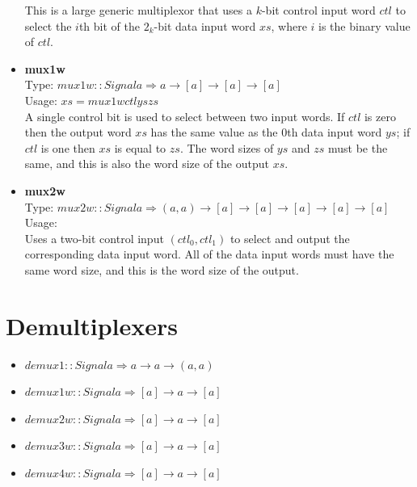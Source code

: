 \documentclass[a4paper,openany,fleqn]{book}
\begin{document}
\begin{itemize}
  This is a large generic multiplexor that uses a $k$-bit control
  input word $\mathit{ctl}$ to select the $i$th bit of the $2_k$-bit
  data input word $\mathit{xs}$, where $i$ is the binary value of
  $\mathit{ctl}$.
\item \textbf{mux1w} \\
  Type: $\mathit{mux1w} :: \mathit{Signal} a \Rightarrow a \rightarrow
  [a] \rightarrow [a] \rightarrow [a]$ \\
  Usage: $xs = mux1w ctl ys zs $\\
  A single control bit is used to select between two input words.  If
  $\mathit{ctl}$ is zero then the output word $\mathit{xs}$ has the
  same value as the 0th data input word $\mathit{ys}$; if
  $\mathit{ctl}$ is one then $\mathit{xs}$ is equal to $\mathit{zs}$.
  The word sizes of $\mathit{ys}$ and $\mathit{zs}$ must be the same,
  and this is also the word size of the output $\mathit{xs}$.
\item \textbf{mux2w} \\
  Type: $\mathit{mux2w} :: Signal a \Rightarrow (a,a) \rightarrow [a]
  \rightarrow [a] \rightarrow [a] \rightarrow [a] \rightarrow [a]$ \\
  Usage: $ $ \\
  Uses a two-bit control input $(\mathit{ctl}_0,\mathit{ctl}_1)$ to
  select and output the corresponding data input word.  All of the
  data input words must have the same word size, and this is the word
  size of the output.
\end{itemize}


\section{Demultiplexers}
\label{sec:demultiplexers}

\begin{itemize}
\item $\mathit{demux1} :: \mathit{Signal} a \Rightarrow a \rightarrow a
  \rightarrow (a,a)$
\item $\mathit{demux1w} :: \mathit{Signal} a \Rightarrow [a]
  \rightarrow a \rightarrow [a]$
\item $\mathit{demux2w} :: \mathit{Signal} a \Rightarrow [a]
  \rightarrow a \rightarrow [a]$
\item $\mathit{demux3w} :: \mathit{Signal} a \Rightarrow [a]
  \rightarrow a \rightarrow [a]$
\item $\mathit{demux4w} :: \mathit{Signal} a \Rightarrow [a]
  \rightarrow a \rightarrow [a]$
\end{itemize}
\end{document}

